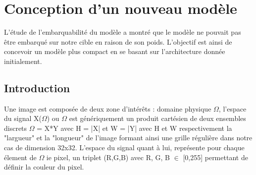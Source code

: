 \documentclass[12pt,a4paper]{article}
\begin{document}
\section{Conception d'un nouveau modèle}
L'étude de l'embarquabilité du modèle  a montré que le modèle ne pouvait pas être embarqué sur notre cible en raison de son poids. L'objectif est ainsi de concevoir un modèle plus compact en se basant sur l'architecture donnée initialement.
\subsection{Introduction}
Une image est composée de deux zone d'intérêts : domaine physique $\Omega$, l'espace du signal X($\Omega$) ou $\Omega$ est génériquement un produit cartésien de deux ensembles discrets $\Omega$ = X*Y avec H  = |X| et W = |Y| avec H et W respectivement la "largueur" et la "longueur" de l'image formant ainsi une grille régulière dans notre cas de dimension 32x32. L'espace du signal quant à lui, représente pour chaque élement de $\Omega$ ie pixel, un triplet (R,G,B) avec R, G, B $\in$ [0,255] permettant de définir la couleur du pixel. 
\end{document}

